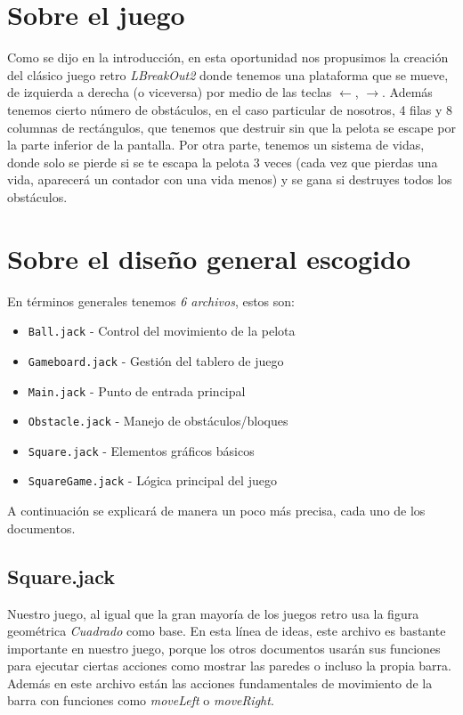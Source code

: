 \documentclass[twocolumn]{article}
\begin{document}
	\section{Sobre el juego}
	Como se dijo en la introducción, en esta oportunidad nos propusimos la creación del clásico juego retro \emph{LBreakOut2} donde tenemos una plataforma que se mueve, de izquierda a derecha (o viceversa) por medio de las teclas $\leftarrow$, $\rightarrow$. Además tenemos cierto número de obstáculos, en el caso particular de nosotros, 4 filas y 8 columnas de rectángulos, que tenemos que destruir sin que la pelota se escape por la parte inferior de la pantalla. Por otra parte, tenemos un sistema de vidas, donde solo se pierde si se te escapa la pelota 3 veces (cada vez que pierdas una vida, aparecerá un contador con una vida menos) y se gana si destruyes todos los obstáculos.
	
	\section{Sobre el diseño general escogido}
	En términos generales tenemos \emph{6 archivos}, estos son: 
	\begin{itemize}
		\item \texttt{Ball.jack} - Control del movimiento de la pelota
		\item \texttt{Gameboard.jack} - Gestión del tablero de juego
		\item \texttt{Main.jack} - Punto de entrada principal
		\item \texttt{Obstacle.jack} - Manejo de obstáculos/bloques
		\item \texttt{Square.jack} - Elementos gráficos básicos
		\item \texttt{SquareGame.jack} - Lógica principal del juego
	\end{itemize}
	
	A continuación se explicará de manera un poco más precisa, cada uno de los documentos.
	
	\subsection{Square.jack}
	Nuestro juego, al igual que la gran mayoría de los juegos retro usa la figura geométrica \emph{Cuadrado} como base. En esta línea de ideas, este archivo es bastante importante en nuestro juego, porque los otros documentos usarán sus funciones para ejecutar ciertas acciones como mostrar las paredes o incluso la propia barra. Además en este archivo están las acciones fundamentales de movimiento de la barra con funciones como \emph{moveLeft} o \emph{moveRight}.  
	
\end{document}
